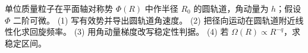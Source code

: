 单位质量粒子在平面轴对称势 $\Phi(R)$ 中作半径 $R_0$ 的圆轨道，角动量为 $h$；假设 $\Phi$ 二阶可微。
(1) 写有效势并导出圆轨道角速度。
(2) 把径向运动在圆轨道附近线性化求回旋频率。
(3) 用角动量梯度改写稳定性判据。
(4) 若 $\Omega(R)\propto R^{-q}$，求稳定区间。
